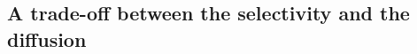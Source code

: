 \documentclass[main]{subfiles}
\begin{document}
\subsection{A trade-off between the selectivity and the diffusion}





\end{document}
